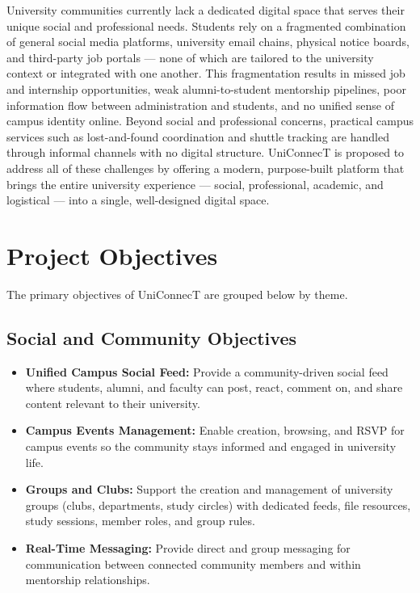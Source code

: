 \documentclass[12pt, a4paper]{article}
\begin{document}
University communities currently lack a dedicated digital space that serves their unique
social and professional needs. Students rely on a fragmented combination of general social
media platforms, university email chains, physical notice boards, and third-party job
portals --- none of which are tailored to the university context or integrated with one
another. This fragmentation results in missed job and internship opportunities, weak
alumni-to-student mentorship pipelines, poor information flow between administration and
students, and no unified sense of campus identity online. Beyond social and professional
concerns, practical campus services such as lost-and-found coordination and shuttle
tracking are handled through informal channels with no digital structure. UniConnecT is
proposed to address all of these challenges by offering a modern, purpose-built platform
that brings the entire university experience --- social, professional, academic, and
logistical --- into a single, well-designed digital space.

\section{Project Objectives}

The primary objectives of UniConnecT are grouped below by theme.

\subsection{Social and Community Objectives}

\begin{itemize}
    \item \textbf{Unified Campus Social Feed:} Provide a community-driven social feed
    where students, alumni, and faculty can post, react, comment on, and share content
    relevant to their university.

    \item \textbf{Campus Events Management:} Enable creation, browsing, and RSVP for
    campus events so the community stays informed and engaged in university life.

    \item \textbf{Groups and Clubs:} Support the creation and management of university
    groups (clubs, departments, study circles) with dedicated feeds, file resources,
    study sessions, member roles, and group rules.

    \item \textbf{Real-Time Messaging:} Provide direct and group messaging for
    communication between connected community members and within mentorship relationships.
\end{itemize}
\end{document}
